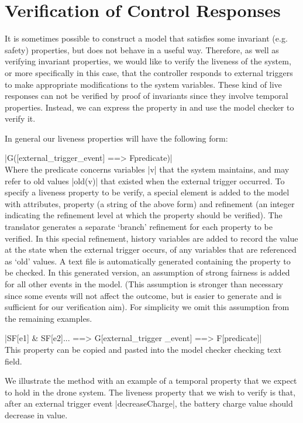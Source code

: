 

\section{Verification of Control Responses}

It is sometimes possible to construct a model that satisfies some invariant (e.g. safety) properties, but does not behave in a useful way.
Therefore, as well as verifying invariant properties, we would like to verify the liveness of the system, or more specifically in this case, that the controller responds to external triggers to make appropriate modifications to the system variables. 
These kind of live responses can not be verified by proof of invariants since they involve temporal properties.
Instead, we can express the property in \LTL  and use the \PROB model checker to verify it.

In general our liveness properties will have the following form:

	|G([external_trigger_event] ==> F{predicate})|
\\
Where the predicate concerns variables |v| that the system maintains, and may refer to old values |old(v)| that existed when the external trigger occurred.
To specify a liveness property to be verify, a special \LTL element is added to the \SCXML model with attributes, property (a string of the above form)  and refinement (an integer indicating the refinement level at which the property should be verified).
The translator generates a separate `branch' refinement for each \LTL property to be verified. 
In this special refinement, history variables are added to record the value at the state when the external trigger occurs, of any variables that are referenced as `old' values.
A text file is automatically generated containing the \LTL property to be checked. 
In this generated version, an assumption of strong fairness is added for all other events in the model.
(This assumption is stronger than necessary since some events will not affect the outcome, but is easier to generate and is sufficient for our verification aim). 
For simplicity we omit this assumption from the remaining examples.

	|SF[e1] & SF[e2]... ==> G[external_trigger _event] ==> F[predicate]|
\\
This property can be copied and pasted into the \PROB model checker \LTL checking text field.

We illustrate the method with an example of a temporal property that we expect to hold in the drone \SCXML system. 
The liveness property that we wish to  verify is that, after an external trigger event |decreaseCharge|, the battery charge value should  decrease in value.

